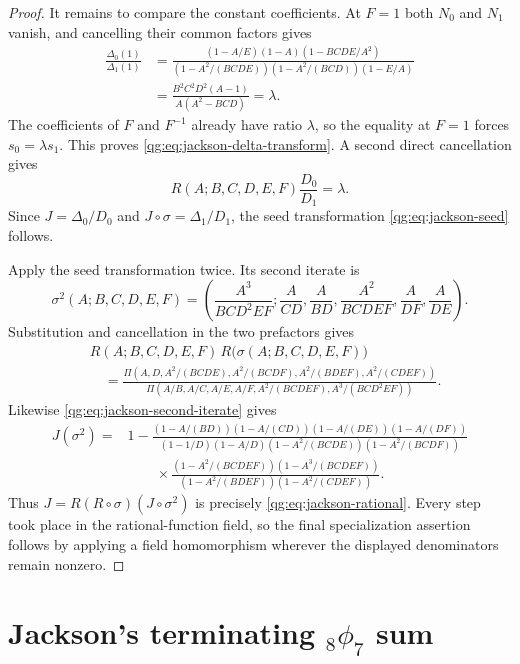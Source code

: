 \begin{proof}
It remains to compare the constant coefficients.  At $F=1$ both $N_0$ and
$N_1$ vanish, and cancelling their common factors gives
\begin{align*}
\frac{\Delta_0(1)}{\Delta_1(1)}
&=\frac{(1-A/E)(1-A)(1-BCDE/A^2)}
{(1-A^2/(BCDE))(1-A^2/(BCD))(1-E/A)}\\
&=\frac{B^2C^2D^2(A-1)}{A(A^2-BCD)}
=\lambda.
\end{align*}
The coefficients of $F$ and $F^{-1}$ already have ratio $\lambda$, so the
equality at $F=1$ forces $s_0=\lambda s_1$.  This proves
\eqref{qg:eq:jackson-delta-transform}.  A second direct cancellation gives
\[
 R(A;B,C,D,E,F)\frac{D_0}{D_1}=\lambda.
\]
Since $J=\Delta_0/D_0$ and
$J\circ\sigma=\Delta_1/D_1$, the seed transformation
\eqref{qg:eq:jackson-seed} follows.

Apply the seed transformation twice.  Its second iterate is
\begin{equation}
\label{qg:eq:jackson-second-iterate}
\sigma^2(A;B,C,D,E,F)
=\left(
 \frac{A^3}{BCD^2EF};
 \frac{A}{CD},\frac{A}{BD},\frac{A^2}{BCDEF},
 \frac{A}{DF},\frac{A}{DE}
\right).
\end{equation}
Substitution and cancellation in the two prefactors gives
\begin{align*}
&R(A;B,C,D,E,F)\,R\bigl(\sigma(A;B,C,D,E,F)\bigr)\\
&\quad=
\frac{\Pi(A,D,A^2/(BCDE),A^2/(BCDF),
 A^2/(BDEF),A^2/(CDEF))}
{\Pi(A/B,A/C,A/E,A/F,A^2/(BCDEF),A^3/(BCD^2EF))}.
\end{align*}
Likewise \eqref{qg:eq:jackson-second-iterate} gives
\begin{align*}
J(\sigma^2)
={}&1-
 \frac{(1-A/(BD))(1-A/(CD))(1-A/(DE))(1-A/(DF))}
 {(1-1/D)(1-A/D)(1-A^2/(BCDE))(1-A^2/(BCDF))}\\
&\qquad\times
 \frac{(1-A^2/(BCDEF))(1-A^3/(BCDEF))}
 {(1-A^2/(BDEF))(1-A^2/(CDEF))}.
\end{align*}
Thus $J=R(R\circ\sigma)(J\circ\sigma^2)$ is precisely
\eqref{qg:eq:jackson-rational}.  Every step took place in the rational-function
field, so the final specialization assertion follows by applying a field
homomorphism wherever the displayed denominators remain nonzero.
\end{proof}

\section{Jackson's terminating \texorpdfstring{${}_8\phi_7$}{8phi7} sum}
\label{qg:sec:jackson-8phi7}


